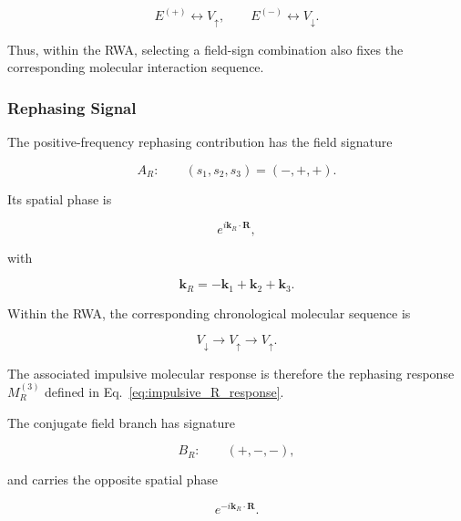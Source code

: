 \documentclass[11pt]{article}
\begin{document}
\begin{equation}
\boxed{
E^{(+)}
\leftrightarrow
V_{\uparrow},
\qquad
E^{(-)}
\leftrightarrow
V_{\downarrow}.
}
\label{eq:short_rwa_pairing}
\end{equation}

Thus, within the RWA, selecting a field-sign combination also fixes the
corresponding molecular interaction sequence.


\subsubsection{Rephasing Signal}

The positive-frequency rephasing contribution has the field signature

\begin{equation}
\boxed{
A_R:
\qquad
(s_1,s_2,s_3)
=
(-,+,+).
}
\label{eq:AR_signature}
\end{equation}

Its spatial phase is

\begin{equation}
e^{i\mathbf{k}_R\cdot\mathbf{R}},
\end{equation}

with

\begin{equation}
\boxed{
\mathbf{k}_R
=
-\mathbf{k}_1
+
\mathbf{k}_2
+
\mathbf{k}_3.
}
\label{eq:k_rephasing}
\end{equation}

Within the RWA, the corresponding chronological molecular sequence is

\begin{equation}
\boxed{
V_{\downarrow}
\rightarrow
V_{\uparrow}
\rightarrow
V_{\uparrow}.
}
\end{equation}

The associated impulsive molecular response is therefore the
rephasing response $M_R^{(3)}$ defined in
Eq.~\eqref{eq:impulsive_R_response}.

The conjugate field branch has signature

\begin{equation}
\boxed{
B_R:
\qquad
(+,-,-),
}
\end{equation}

and carries the opposite spatial phase

\begin{equation}
e^{-i\mathbf{k}_R\cdot\mathbf{R}}.
\end{equation}
\end{document}

